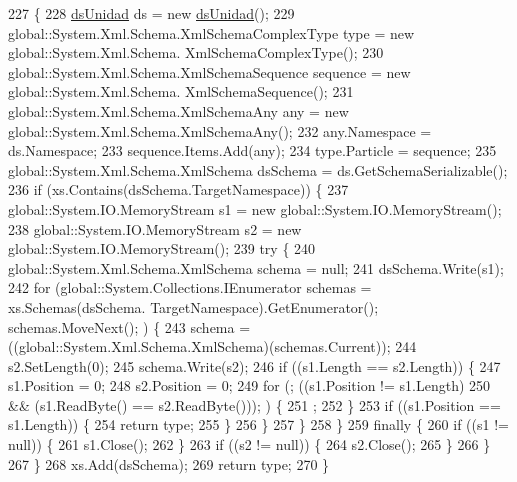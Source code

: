 \begin{DoxyCode}
227                                                                                                            
                             \{
228             \hyperlink{class_proyecto___integrador__3_1_1ds_unidad_ab6be91d0b9503d2e08dacc48aaaf6446}{dsUnidad} ds = \textcolor{keyword}{new} \hyperlink{class_proyecto___integrador__3_1_1ds_unidad_ab6be91d0b9503d2e08dacc48aaaf6446}{dsUnidad}();
229             global::System.Xml.Schema.XmlSchemaComplexType type = \textcolor{keyword}{new} global::System.Xml.Schema.
      XmlSchemaComplexType();
230             global::System.Xml.Schema.XmlSchemaSequence sequence = \textcolor{keyword}{new} global::System.Xml.Schema.
      XmlSchemaSequence();
231             global::System.Xml.Schema.XmlSchemaAny any = \textcolor{keyword}{new} global::System.Xml.Schema.XmlSchemaAny();
232             any.Namespace = ds.Namespace;
233             sequence.Items.Add(any);
234             type.Particle = sequence;
235             global::System.Xml.Schema.XmlSchema dsSchema = ds.GetSchemaSerializable();
236             \textcolor{keywordflow}{if} (xs.Contains(dsSchema.TargetNamespace)) \{
237                 global::System.IO.MemoryStream s1 = \textcolor{keyword}{new} global::System.IO.MemoryStream();
238                 global::System.IO.MemoryStream s2 = \textcolor{keyword}{new} global::System.IO.MemoryStream();
239                 \textcolor{keywordflow}{try} \{
240                     global::System.Xml.Schema.XmlSchema schema = null;
241                     dsSchema.Write(s1);
242                     \textcolor{keywordflow}{for} (global::System.Collections.IEnumerator schemas = xs.Schemas(dsSchema.
      TargetNamespace).GetEnumerator(); schemas.MoveNext(); ) \{
243                         schema = ((global::System.Xml.Schema.XmlSchema)(schemas.Current));
244                         s2.SetLength(0);
245                         schema.Write(s2);
246                         \textcolor{keywordflow}{if} ((s1.Length == s2.Length)) \{
247                             s1.Position = 0;
248                             s2.Position = 0;
249                             \textcolor{keywordflow}{for} (; ((s1.Position != s1.Length) 
250                                         && (s1.ReadByte() == s2.ReadByte())); ) \{
251                                 ;
252                             \}
253                             \textcolor{keywordflow}{if} ((s1.Position == s1.Length)) \{
254                                 \textcolor{keywordflow}{return} type;
255                             \}
256                         \}
257                     \}
258                 \}
259                 \textcolor{keywordflow}{finally} \{
260                     \textcolor{keywordflow}{if} ((s1 != null)) \{
261                         s1.Close();
262                     \}
263                     \textcolor{keywordflow}{if} ((s2 != null)) \{
264                         s2.Close();
265                     \}
266                 \}
267             \}
268             xs.Add(dsSchema);
269             \textcolor{keywordflow}{return} type;
270         \}
\end{DoxyCode}
